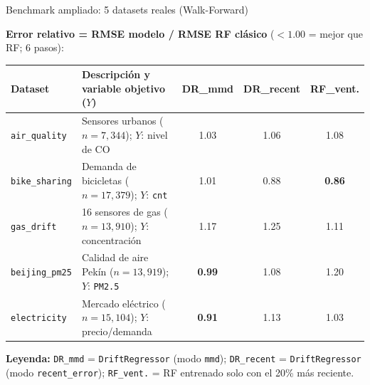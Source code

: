 \documentclass[aspectratio=169,11pt,table]{beamer}
\begin{document}
\begin{frame}{Benchmark ampliado: 5 datasets reales (Walk-Forward)}
\begin{ccdebox}[top=1mm,bottom=1mm]
\scriptsize
\textbf{Error relativo = RMSE modelo / RMSE RF clásico} ($< 1.00$ = mejor que RF; 6 pasos):\\[0.05cm]
\centering
\renewcommand{\arraystretch}{0.95}
\begin{tabular}{@{}l p{4.6cm} c c c@{}}
\toprule
\textbf{Dataset} & \textbf{Descripción y variable objetivo ($Y$)} & \textbf{DR\_mmd} & \textbf{DR\_recent} & \textbf{RF\_vent.} \\
\midrule
\texttt{air\_quality} & Sensores urbanos ($n=7{,}344$); $Y$: nivel de CO & 1.03 & 1.06 & 1.08 \\
\texttt{bike\_sharing} & Demanda de bicicletas ($n=17{,}379$); $Y$: \texttt{cnt} & 1.01 & 0.88 & \textbf{0.86} \\
\texttt{gas\_drift} & 16 sensores de gas ($n=13{,}910$); $Y$: concentración & 1.17 & 1.25 & 1.11 \\
\texttt{beijing\_pm25} & Calidad de aire Pekín ($n=13{,}919$); $Y$: \texttt{PM2.5} & \textbf{0.99} & 1.08 & 1.20 \\
\texttt{electricity} & Mercado eléctrico ($n=15{,}104$); $Y$: precio/demanda & \textbf{0.91} & 1.13 & 1.03 \\
\bottomrule
\end{tabular}
\end{ccdebox}

\vspace{0.06cm}
\begin{keybox}[top=1mm,bottom=1mm]
\scriptsize
\textbf{Leyenda:} \texttt{DR\_mmd} = \texttt{DriftRegressor} (modo \texttt{mmd}); \texttt{DR\_recent} = \texttt{DriftRegressor} (modo \texttt{recent\_error}); \texttt{RF\_vent.} = RF entrenado solo con el 20\% más reciente.
\end{keybox}
\end{frame}
\end{document}
